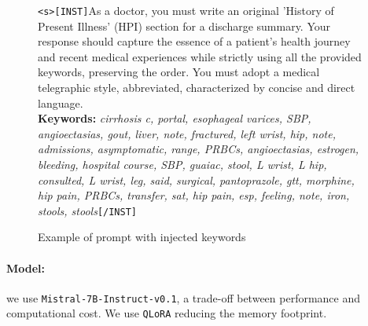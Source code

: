 \begin{figure}
\centering
\begin{modelinput}
\verb|<s>[INST]|As a doctor, you must write an original 'History of Present Illness' (HPI) section for a discharge summary.
Your response should capture the essence of a patient's health journey and recent medical experiences while strictly using all the provided keywords, preserving the order.
You must adopt a medical telegraphic style, abbreviated, characterized by concise and direct language.
\\
\textbf{Keywords:} \textit{cirrhosis c, portal, esophageal varices, SBP, angioectasias, gout, liver, note, fractured, left wrist, hip, note, admissions, asymptomatic, range, PRBCs, angioectasias, estrogen, bleeding, hospital course, SBP, guaiac, stool, L wrist, L hip, consulted, L wrist, leg, said, surgical, pantoprazole, gtt, morphine, hip pain, PRBCs, transfer, sat, hip pain, esp, feeling, note, iron, stools, stools}\verb|[/INST]|
\end{modelinput}
\caption{Example of prompt with injected keywords}
\label{fig:synth_prompt}
\end{figure}    

\paragraph{Model:} we use \space\verb|Mistral-7B-Instruct-v0.1|\space\citep{jiangMistral7B2023}, a trade-off between performance and computational cost. We use \verb|QLoRA|\space\citep{dettmers_qlora_2023} reducing the memory footprint.

